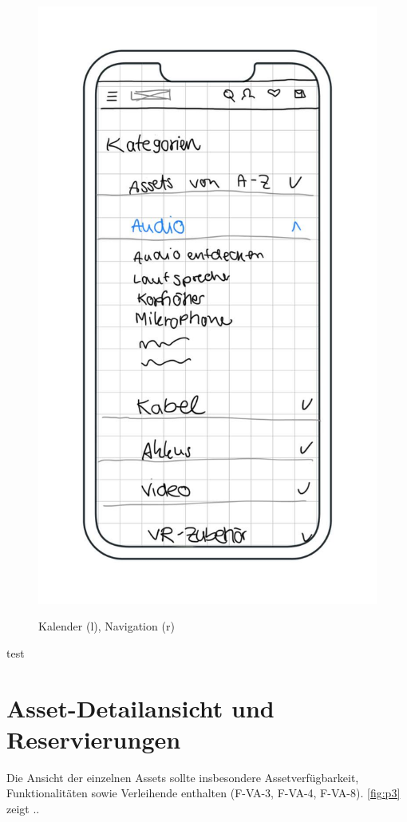 \begin{figure}[h]
    \includegraphics[scale=0.37]{Bilder/Mockups/Kategorien.jpg}
    \label{fig:kalender}
\caption[Kalenderkomponente]{Kalender (l), Navigation (r)}
\end{figure}
test


\section{Asset-Detailansicht und Reservierungen}
Die Ansicht der einzelnen Assets sollte insbesondere Assetverfügbarkeit, Funktionalitäten sowie
Verleihende enthalten (F-VA-3, F-VA-4, F-VA-8). \ref{fig:p3} zeigt ..

